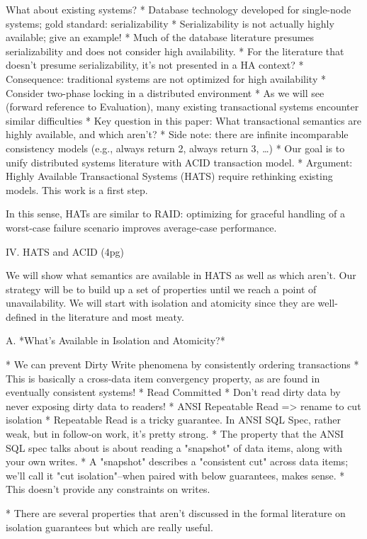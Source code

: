 What about existing systems?
* Database technology developed for single-node systems; gold standard: serializability
	* Serializability is not actually highly available; give an example!
	* Much of the database literature presumes serializability and does not consider high availability.
	* For the literature that doesn't presume serializability, it's not presented in a HA context?
* Consequence: traditional systems are not optimized for high availability
	* Consider two-phase locking in a distributed environment
	* As we will see (forward reference to Evaluation), many existing transactional systems encounter similar difficulties
* Key question in this paper: What transactional semantics are highly available, and which aren't?
	* Side note: there are infinite incomparable consistency models (e.g., always return 2, always return 3, …)
	* Our goal is to unify distributed systems literature with ACID transaction model.
* Argument: Highly Available Transactional Systems (HATS) require rethinking existing models. This work is a first step.

In this sense, HATs are similar to RAID: optimizing for graceful
handling of a worst-case failure scenario improves average-case
performance.

IV. HATS and ACID (4pg)

We will show what semantics are available in HATS as well as which aren't. Our strategy will be to build up a set of properties until we reach a point of unavailability. We will start with isolation and atomicity since they are well-defined in the literature and most meaty.

A. *What's Available in Isolation and Atomicity?*

* We can prevent Dirty Write phenomena by consistently ordering transactions
	* This is basically a cross-data item convergency property, as are found in eventually consistent systems!
* Read Committed
	* Don't read dirty data by never exposing dirty data to readers!
* ANSI Repeatable Read => rename to cut isolation
	* Repeatable Read is a tricky guarantee. In ANSI SQL Spec, rather weak, but in follow-on work, it's pretty strong.
	* The property that the ANSI SQL spec talks about is about reading a "snapshot" of data items, along with your own writes.
		* A "snapshot" describes a "consistent cut" across data items; we'll call it "cut isolation"--when paired with below guarantees, makes sense.
	* This doesn't provide any constraints on writes.

* There are several properties that aren't discussed in the formal literature on isolation guarantees but which are really useful.

